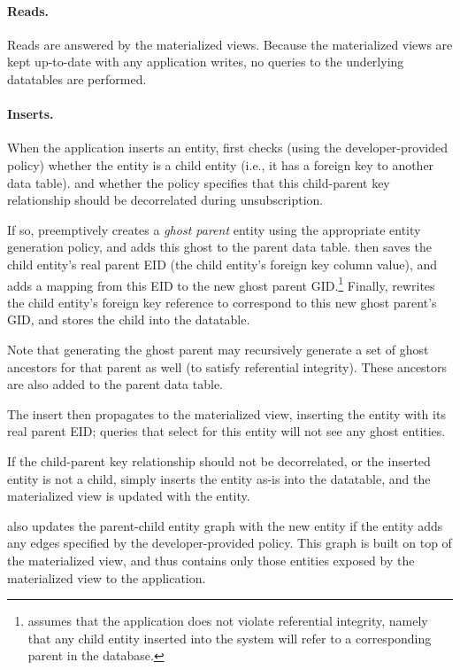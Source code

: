 \paragraph{Reads.}
Reads are answered by the materialized views. Because the materialized views are kept up-to-date with any application
writes, no queries to the underlying datatables are performed.

\paragraph{Inserts.}
When the application inserts an entity, \sys{} first checks (using the developer-provided policy) whether
the entity is a child entity (i.e., it has a foreign key to another data table). 
and whether the policy specifies that this child-parent key
relationship should be decorrelated during unsubscription. 

If so, \sys{} preemptively creates a \emph{ghost parent} entity using the appropriate entity
generation policy, and adds this ghost to the parent data table. \sys{} then saves the child
entity's real parent EID (the child entity's foreign key column value), and adds a mapping from this
EID to the new ghost parent GID.\footnote{\sys{} assumes that the application does not violate
referential integrity, namely that any child entity inserted into the system will refer to a
corresponding parent in the database.} Finally, \sys{} rewrites the child entity's foreign key
reference to correspond to this new ghost parent's GID, and stores the child into the datatable.

Note that generating the ghost parent may recursively generate a set of ghost ancestors for that
parent as well (to satisfy referential integrity). These ancestors are also added to the parent data
table.

The insert then propagates to the materialized view, inserting the entity with its real parent EID; queries that
select for this entity will not see any ghost entities. 

If the child-parent key relationship should not be decorrelated, or the inserted entity is not a
child, \sys{} simply inserts the entity as-is into the datatable, and the materialized view is
updated with the entity.

\sys{} also updates the parent-child entity graph with the new entity if the entity adds any edges
specified by the developer-provided policy. This graph is built on top of the materialized view, and
thus contains only those entities exposed by the materialized view to the application.

